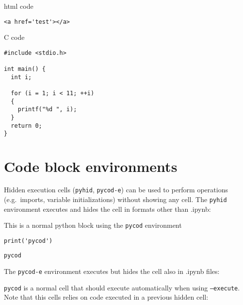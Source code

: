 \documentclass[%
oneside,                 %
final,                   %
chapterprefix=true,      %
open=right,              %
10pt]{book}
\begin{document}
html code


\begin{Verbatim}[numbers=none,fontsize=\fontsize{9pt}{9pt},baselinestretch=0.95]
<a href='test'></a>

\end{Verbatim}


C code












\begin{Verbatim}[numbers=none,fontsize=\fontsize{9pt}{9pt},baselinestretch=0.95]
#include <stdio.h>

int main() {
  int i;

  for (i = 1; i < 11; ++i)
  {
    printf("%d ", i);
  }
  return 0;
}

\end{Verbatim}


\section{Code block environments}

Hidden execution cells (\texttt{pyhid}, \texttt{pycod-e}) can be used to perform operations (e.g.~imports, variable initializations) without showing any cell.
The \texttt{pyhid} environment executes and hides the cell in formats other than .ipynb:

This is a normal python block using the \texttt{pycod} environment


\begin{Verbatim}[numbers=none,fontsize=\fontsize{9pt}{9pt},baselinestretch=0.95]
print('pycod')

\end{Verbatim}

\begin{Verbatim}[numbers=none,fontsize=\fontsize{9pt}{9pt},baselinestretch=0.95]
pycod
\end{Verbatim}







The \texttt{pycod-e} environment executes but hides the cell also in .ipynb files:







\texttt{pycod} is a normal cell that should execute automatically when using \texttt{--execute}. Note that this cells relies on code executed in a previous hidden cell:
\end{document}
